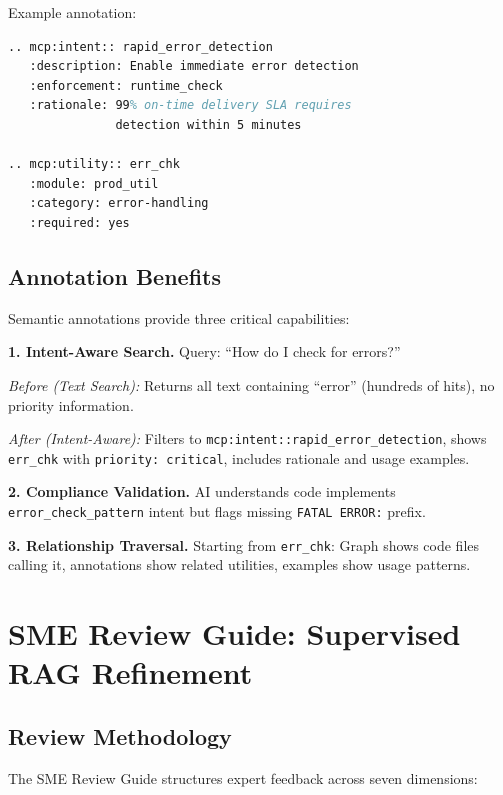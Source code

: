 \documentclass[11pt,letterpaper]{article}
\begin{document}
Example annotation:

\begin{lstlisting}[language=TeX,caption={Semantic Annotation Example}]
.. mcp:intent:: rapid_error_detection
   :description: Enable immediate error detection
   :enforcement: runtime_check
   :rationale: 99% on-time delivery SLA requires 
               detection within 5 minutes

.. mcp:utility:: err_chk
   :module: prod_util
   :category: error-handling
   :required: yes
\end{lstlisting}

\subsection{Annotation Benefits}

Semantic annotations provide three critical capabilities:

\textbf{1. Intent-Aware Search.} Query: ``How do I check for errors?''

\textit{Before (Text Search):} Returns all text containing ``error'' (hundreds of hits), no priority information.

\textit{After (Intent-Aware):} Filters to \texttt{mcp:intent::rapid\_error\_detection}, shows \texttt{err\_chk} with \texttt{priority: critical}, includes rationale and usage examples.

\textbf{2. Compliance Validation.} AI understands code implements \texttt{error\_check\_pattern} intent but flags missing \texttt{FATAL ERROR:} prefix.

\textbf{3. Relationship Traversal.} Starting from \texttt{err\_chk}: Graph shows code files calling it, annotations show related utilities, examples show usage patterns.

\section{SME Review Guide: Supervised RAG Refinement}
\label{sec:sme}

\subsection{Review Methodology}

The SME Review Guide structures expert feedback across seven dimensions:
\end{document}
